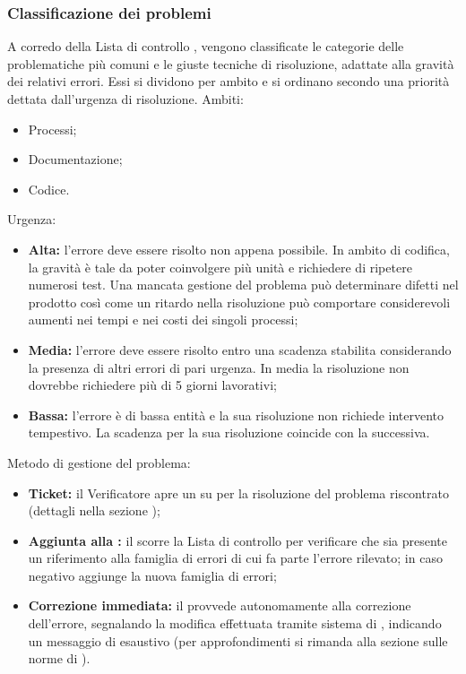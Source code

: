 \documentclass[12pt,a4paper]{article}
\begin{document}
\subsubsection{Classificazione dei problemi}
A corredo della Lista di controllo \TODO{}, vengono classificate le categorie delle problematiche più comuni e le giuste tecniche di risoluzione, adattate alla gravità dei relativi errori. Essi si dividono per ambito e si ordinano secondo una priorità dettata dall'urgenza di risoluzione. Ambiti:
\begin{itemize}
  \item Processi;
  \item Documentazione;
  \item Codice.
\end{itemize}
Urgenza:
\begin{itemize}
  \item \textbf{Alta:} l'errore deve essere risolto non appena possibile. In ambito di codifica, la gravità è tale da poter coinvolgere più unità e richiedere di ripetere numerosi test. Una mancata gestione del problema può determinare difetti nel prodotto così come un ritardo nella risoluzione può comportare considerevoli aumenti nei tempi e nei costi dei singoli processi;
  \item \textbf{Media:} l'errore deve essere risolto entro una scadenza stabilita considerando la presenza di altri errori di pari urgenza. In media la risoluzione non dovrebbe richiedere più di 5 giorni lavorativi;
  \item \textbf{Bassa:} l'errore è di bassa entità e la sua risoluzione non richiede intervento tempestivo. La scadenza per la sua risoluzione coincide con la  successiva.
\end{itemize}
Metodo di gestione del problema:
\begin{itemize}
  \item \textbf{Ticket:} il Verificatore apre un  su  per la risoluzione del problema riscontrato (dettagli nella sezione \TODO{});
  \item \textbf{Aggiunta alla :} il \VR{} scorre la Lista di controllo per verificare che sia presente un riferimento alla famiglia di errori di cui fa parte l'errore rilevato; in caso negativo aggiunge la nuova famiglia di errori;
  \item \textbf{Correzione immediata:} il \VR provvede autonomamente alla correzione dell'errore, segnalando la modifica effettuata tramite sistema di , indicando un messaggio di  esaustivo (per approfondimenti si rimanda alla sezione sulle norme di  \TODO{}).
\end{itemize}
\end{document}
